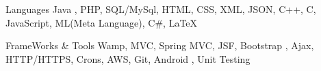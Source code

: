 


\begin{cvskills}


\cvskill
{Languages} %
{ Java , PHP, SQL/MySql, HTML, CSS, XML, JSON, C++,  C, JavaScript, ML(Meta Language), C\#, LaTeX} %


\cvskill
{FrameWorks \& Tools} %
{ Wamp, MVC, Spring MVC, JSF, Bootstrap , Ajax, HTTP/HTTPS, Crons, AWS, Git, Android , Unit Testing} %



\end{cvskills}